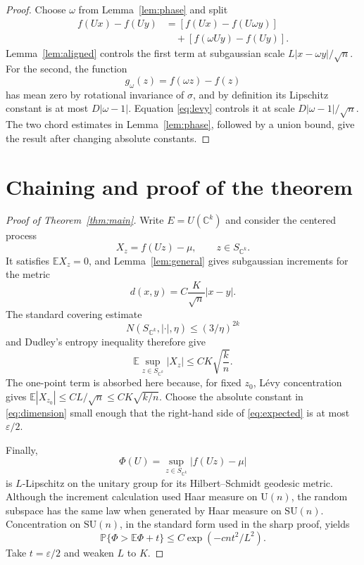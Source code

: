 \documentclass[11pt]{article}
\theoremstyle{remark}
\newcommand{\C}{\mathbb C}
\newcommand{\E}{\mathbb E}
\begin{document}
\begin{proof}
Choose \(\omega\) from Lemma~\ref{lem:phase} and split
\begin{align*}
 f(Ux)-f(Uy)
 &=[f(Ux)-f(U\omega y)]\\
 &\quad+[f(\omega Uy)-f(Uy)].
\end{align*}
Lemma~\ref{lem:aligned} controls the first term at subgaussian scale
\(L|x-\omega y|/\sqrt n\).  For the second, the function
\[
 g_\omega(z)=f(\omega z)-f(z)
\]
has mean zero by rotational invariance of \(\sigma\), and by definition its
Lipschitz constant is at most \(D|\omega-1|\).  Equation
\eqref{eq:levy} controls it at scale \(D|\omega-1|/\sqrt n\).
The two chord estimates in Lemma~\ref{lem:phase}, followed by a union bound,
give the result after changing absolute constants.
\end{proof}

\section{Chaining and proof of the theorem}

\begin{proof}[Proof of Theorem~\ref{thm:main}]
Write \(E=U(\C^k)\) and consider the centered process
\[
 X_z=f(Uz)-\mu,\qquad z\in S_{\C^k}.
\]
It satisfies \(\E X_z=0\), and Lemma~\ref{lem:general} gives subgaussian
increments for the metric
\[
 d(x,y)=C\frac{K}{\sqrt n}|x-y|.
\]
The standard covering estimate
\[
 N(S_{\C^k},|\cdot|,\eta)\leq(3/\eta)^{2k}
\]
and Dudley's entropy inequality \cite{Talagrand} therefore give
\begin{equation}\label{eq:expected}
 \E\sup_{z\in S_{\C^k}}|X_z|
 \leq C K\sqrt{\frac{k}{n}}.
\end{equation}
The one-point term is absorbed here because, for fixed \(z_0\), L\'evy
concentration gives
\(\E|X_{z_0}|\leq C L/\sqrt n\leq C K\sqrt{k/n}\).
Choose the absolute constant in \eqref{eq:dimension} small enough that the
right-hand side of \eqref{eq:expected} is at most \(\varepsilon/2\).

Finally,
\[
 \Phi(U)=\sup_{z\in S_{\C^k}}|f(Uz)-\mu|
\]
is \(L\)-Lipschitz on the unitary group for its Hilbert--Schmidt geodesic
metric.  Although the increment calculation used Haar measure on
\(\mathrm U(n)\), the random subspace has the same law when generated by
Haar measure on \(\mathrm{SU}(n)\).  Concentration on \(\mathrm{SU}(n)\), in
the standard form used in the sharp proof, yields
\[
 \mathbb P\{\Phi>\E\Phi+t\}
 \leq C\exp(-c n t^2/L^2).
\]
Take \(t=\varepsilon/2\) and weaken \(L\) to \(K\).
\end{proof}
\end{document}
